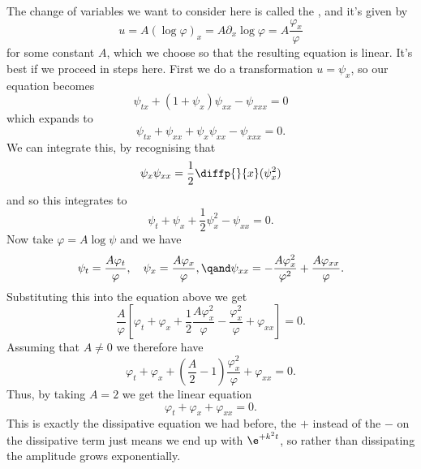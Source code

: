 \documentclass[fleqn]{NotesClass}
\begin{document}
    The change of variables we want to consider here is called the , and it's given by
    \begin{equation}
        u = A(\log \varphi)_x = A \partial_x \log \varphi = A\frac{\varphi_x}{\varphi}
    \end{equation}
    for some constant \(A\), which we choose so that the resulting equation is linear.
    It's best if we proceed in steps here.
    First we do a transformation \(u = \psi_x\), so our equation becomes
    \begin{equation}
        \psi_{tx} + (1 + \psi_x)\psi_{xx} - \psi_{xxx} = 0
    \end{equation}
    which expands to
    \begin{equation}
        \psi_{tx} + \psi_{xx} + \psi_x \psi_{xx} - \psi_{xxx} = 0.
    \end{equation}
    We can integrate this, by recognising that
    \begin{equation}
        \psi_x\psi_{xx} = \frac{1}{2}\diffp{}{x}(\psi_x^2)
    \end{equation}
    and so this integrates to
    \begin{equation}
        \psi_t + \psi_x + \frac{1}{2}\psi_x^2 - \psi_{xx} = 0.
    \end{equation}
    Now take \(\varphi = A\log \psi\) and we have
    \begin{equation}
        \psi_t = \frac{A \varphi_t}{\varphi}, \quad \psi_x = \frac{A \varphi_x}{\varphi}, \qand \psi_{xx} = -\frac{A\varphi_x^2}{\varphi^2} + \frac{A\varphi_{xx}}{\varphi}.
    \end{equation}
    Substituting this into the equation above we get
    \begin{equation}
        \frac{A}{\varphi} \left[ \varphi_t + \varphi_x + \frac{1}{2}\frac{A\varphi_x^2}{\varphi} - \frac{\varphi_x^2}{\varphi} + \varphi_{xx} \right] = 0.
    \end{equation}
    Assuming that \(A \ne 0\) we therefore have
    \begin{equation}
        \varphi_t + \varphi_x + \left( \frac{A}{2} - 1 \right) \frac{\varphi_x^2}{\varphi} + \varphi_{xx} = 0.
    \end{equation}
    Thus, by taking \(A = 2\) we get the linear equation
    \begin{equation}
        \varphi_t + \varphi_x + \varphi_{xx} = 0.
    \end{equation}
    This is exactly the dissipative equation we had before, the \(+\) instead of the \(-\) on the dissipative term just means we end up with \(\e^{+k^2t}\), so rather than dissipating the amplitude grows exponentially.
    
\end{document}
